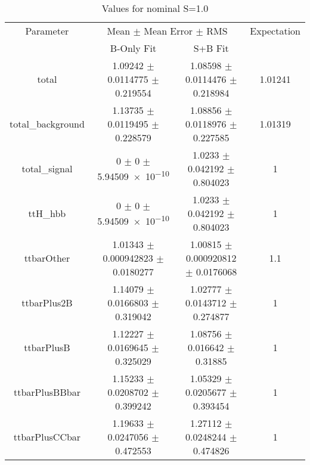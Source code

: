 \begin{table}
\centering
\caption{Values for nominal S=1.0}
\begin{tabular}{cccc}
\toprule
Parameter & \multicolumn{2}{c}{Mean $\pm$ Mean Error $\pm$ RMS} & Expectation\\
 & B-Only Fit & S+B Fit & \\
\midrule
total & \num{1.09242} $\pm$ \num{0.0114775} $\pm$ \num{0.219554} & \num{1.08598} $\pm$ \num{0.0114476} $\pm$ \num{0.218984} & \num{1.01241}\\
total\_background & \num{1.13735} $\pm$ \num{0.0119495} $\pm$ \num{0.228579} & \num{1.08856} $\pm$ \num{0.0118976} $\pm$ \num{0.227585} & \num{1.01319}\\
total\_signal & \num{0} $\pm$ \num{0} $\pm$ \num{5.94509e-10} & \num{1.0233} $\pm$ \num{0.042192} $\pm$ \num{0.804023} & \num{1}\\
ttH\_hbb & \num{0} $\pm$ \num{0} $\pm$ \num{5.94509e-10} & \num{1.0233} $\pm$ \num{0.042192} $\pm$ \num{0.804023} & \num{1}\\
ttbarOther & \num{1.01343} $\pm$ \num{0.000942823} $\pm$ \num{0.0180277} & \num{1.00815} $\pm$ \num{0.000920812} $\pm$ \num{0.0176068} & \num{1.1}\\
ttbarPlus2B & \num{1.14079} $\pm$ \num{0.0166803} $\pm$ \num{0.319042} & \num{1.02777} $\pm$ \num{0.0143712} $\pm$ \num{0.274877} & \num{1}\\
ttbarPlusB & \num{1.12227} $\pm$ \num{0.0169645} $\pm$ \num{0.325029} & \num{1.08756} $\pm$ \num{0.016642} $\pm$ \num{0.31885} & \num{1}\\
ttbarPlusBBbar & \num{1.15233} $\pm$ \num{0.0208702} $\pm$ \num{0.399242} & \num{1.05329} $\pm$ \num{0.0205677} $\pm$ \num{0.393454} & \num{1}\\
ttbarPlusCCbar & \num{1.19633} $\pm$ \num{0.0247056} $\pm$ \num{0.472553} & \num{1.27112} $\pm$ \num{0.0248244} $\pm$ \num{0.474826} & \num{1}\\
\bottomrule
\end{tabular}
\end{table}